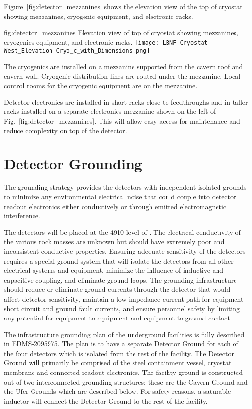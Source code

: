 Figure~\ref{fig:detector_mezzanines} shows the elevation view of the
top of cryostat showing mezzanines, cryogenic equipment, and
electronic racks.
\begin{dunefigure}{fig:detector_mezzanines}
  {Elevation view of top of cryostat showing mezzanines, cryogenics
    equipment, and electronic racks.}
  \texttt{[image: LBNF-Cryostat-West\_Elevation-Cryo\_c\_with\_Dimensions.png]}
\end{dunefigure}
The cryogenics are installed on a mezzanine supported from
the cavern roof and cavern wall. Cryogenic distribution lines are
routed under the mezzanine. Local control rooms for the
cryogenic equipment are on the mezzanine.

Detector electronics are installed in short racks close to
feedthroughs and in taller racks installed on a separate electronics
mezzanine shown on the left of Fig.~\ref{fig:detector_mezzanines}.
This will allow easy access for maintenance and reduce complexity on
top of the detector.

\section{Detector Grounding}
\label{sec:fdsp-coord-faci-grounding}


The grounding strategy provides the detectors with independent
isolated grounds to minimize any environmental electrical noise that
could couple into detector readout electronics either conductively or
through emitted electromagnetic interference.

The detectors will be placed at the 4910 level of \surf. The
electrical conductivity of the various rock masses are unknown but
should have extremely poor and inconsistent conductive
properties. Ensuring adequate sensitivity of the detectors requires a
special ground system that will isolate the detectors from all other
electrical systems and equipment, minimize the influence of inductive
and capacitive coupling, and eliminate ground loops. The grounding
infrastructure should reduce or eliminate ground currents through the
detector that would affect detector sensitivity, maintain a low
impedance current path for equipment short circuit and ground fault
currents, and ensure personnel safety by limiting any potential for
equipment-to-equipment and equipment-to-ground contact.

The infrastructure grounding plan of the underground facilities is
fully described in EDMS-2095975\cite{bib:cernedms2095975}.  The plan is to have a separate
Detector Ground for each of the four detectors which is isolated from
the rest of the facility.  The Detector Ground will primarily be
comprised of the steel containment vessel, cryostat membrane and
connected readout electronics.  The facility ground is constructed out
of two interconnected grounding structures; these are the Cavern
Ground and the Ufer Grounds which are described below.  For safety
reasons, a saturable inductor will connect the Detector Ground to the
rest of the facility.


